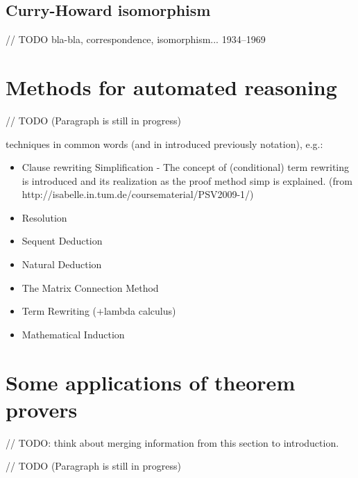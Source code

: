 \documentclass[article]{aaltoseries}
\begin{document}



\subsection{Curry-Howard isomorphism}
// TODO
bla-bla, correspondence, isomorphism...
1934–1969


\section{Methods for automated reasoning}
\label{sec:auto_reasoning}

// TODO (Paragraph is still in progress)

techniques in common words (and in introduced previously notation), e.g.: 
\begin{itemize}
\itemsep0em
	\item Clause rewriting
		Simplification - The concept of (conditional) term rewriting is introduced and its realization as the proof method simp is explained. (from http://isabelle.in.tum.de/coursematerial/PSV2009-1/)
		
	\item Resolution
	\item Sequent Deduction
	\item Natural Deduction
	\item The Matrix Connection Method
	\item Term Rewriting (+lambda calculus)
	\item Mathematical Induction
\end{itemize}




\section{Some applications of theorem provers}
\label{sec:applications}

// TODO: think about merging information from this section to introduction.

// TODO (Paragraph is still in progress) 
\end{document}
